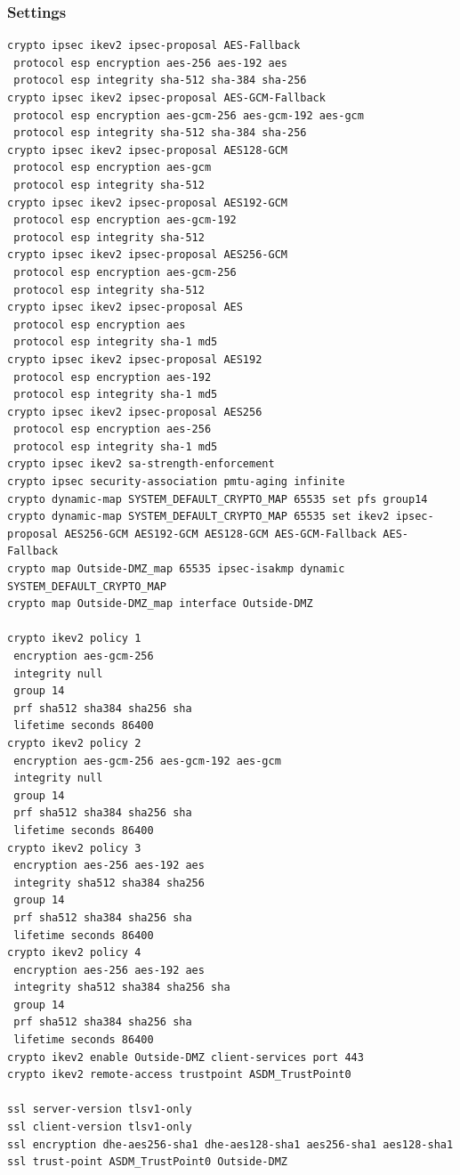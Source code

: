 \subsubsection{Settings}
\begin{lstlisting}
crypto ipsec ikev2 ipsec-proposal AES-Fallback
 protocol esp encryption aes-256 aes-192 aes
 protocol esp integrity sha-512 sha-384 sha-256
crypto ipsec ikev2 ipsec-proposal AES-GCM-Fallback
 protocol esp encryption aes-gcm-256 aes-gcm-192 aes-gcm
 protocol esp integrity sha-512 sha-384 sha-256
crypto ipsec ikev2 ipsec-proposal AES128-GCM
 protocol esp encryption aes-gcm
 protocol esp integrity sha-512
crypto ipsec ikev2 ipsec-proposal AES192-GCM
 protocol esp encryption aes-gcm-192
 protocol esp integrity sha-512
crypto ipsec ikev2 ipsec-proposal AES256-GCM
 protocol esp encryption aes-gcm-256
 protocol esp integrity sha-512
crypto ipsec ikev2 ipsec-proposal AES
 protocol esp encryption aes
 protocol esp integrity sha-1 md5
crypto ipsec ikev2 ipsec-proposal AES192
 protocol esp encryption aes-192
 protocol esp integrity sha-1 md5
crypto ipsec ikev2 ipsec-proposal AES256
 protocol esp encryption aes-256
 protocol esp integrity sha-1 md5
crypto ipsec ikev2 sa-strength-enforcement
crypto ipsec security-association pmtu-aging infinite
crypto dynamic-map SYSTEM_DEFAULT_CRYPTO_MAP 65535 set pfs group14
crypto dynamic-map SYSTEM_DEFAULT_CRYPTO_MAP 65535 set ikev2 ipsec-proposal AES256-GCM AES192-GCM AES128-GCM AES-GCM-Fallback AES-Fallback
crypto map Outside-DMZ_map 65535 ipsec-isakmp dynamic SYSTEM_DEFAULT_CRYPTO_MAP
crypto map Outside-DMZ_map interface Outside-DMZ

crypto ikev2 policy 1
 encryption aes-gcm-256
 integrity null
 group 14
 prf sha512 sha384 sha256 sha
 lifetime seconds 86400
crypto ikev2 policy 2
 encryption aes-gcm-256 aes-gcm-192 aes-gcm
 integrity null
 group 14
 prf sha512 sha384 sha256 sha
 lifetime seconds 86400
crypto ikev2 policy 3
 encryption aes-256 aes-192 aes
 integrity sha512 sha384 sha256
 group 14
 prf sha512 sha384 sha256 sha
 lifetime seconds 86400
crypto ikev2 policy 4
 encryption aes-256 aes-192 aes
 integrity sha512 sha384 sha256 sha
 group 14
 prf sha512 sha384 sha256 sha
 lifetime seconds 86400
crypto ikev2 enable Outside-DMZ client-services port 443
crypto ikev2 remote-access trustpoint ASDM_TrustPoint0

ssl server-version tlsv1-only
ssl client-version tlsv1-only
ssl encryption dhe-aes256-sha1 dhe-aes128-sha1 aes256-sha1 aes128-sha1
ssl trust-point ASDM_TrustPoint0 Outside-DMZ
\end{lstlisting}

